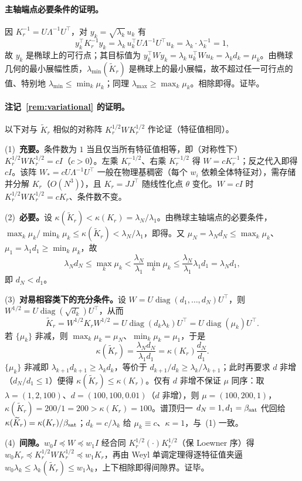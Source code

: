 \documentclass[fontset=windows,11pt]{ctexart}
\newcommand{\W}{W}
\DeclareMathOperator{\diag}{diag}
\numberwithin{equation}{section}
\begin{document}
\paragraph{主轴端点必要条件的证明。}
因 $K_r^{-1}=U\Lambda^{-1}U^\top$，对 $y_k=\sqrt{\lambda_k}\,u_k$ 有
\[
y_k^\top K_r^{-1}y_k=\lambda_k\,u_k^\top U\Lambda^{-1}U^\top u_k=\lambda_k\cdot\lambda_k^{-1}=1,
\]
故 $y_k$ 是椭球上的可行点；其目标值为 $y_k^\top\W y_k=\lambda_k\,u_k^\top\W u_k=\lambda_k d_k=\mu_k$。由椭球几何的最小展幅性质，$\lambda_{\min}(\widetilde K_r)$ 是椭球上的最小展幅，故不超过任一可行点的值、特别地 $\lambda_{\min}\le\min_k\mu_k$；同理 $\lambda_{\max}\ge\max_k\mu_k$。相除即得。证毕。

\paragraph{注记~\ref{rem:variational} 的证明。}
以下对与 $\widetilde K_r$ 相似的对称阵 $K_r^{1/2}\W K_r^{1/2}$ 作论证（特征值相同）。
\par\noindent(1)~\textbf{充要。}条件数为 $1$ 当且仅当所有特征值相等，即（对称性下）$K_r^{1/2}\W K_r^{1/2}=cI$（$c>0$）。左乘 $K_r^{-1/2}$、右乘 $K_r^{-1/2}$ 得 $\W=cK_r^{-1}$；反之代入即得 $cI$。该阵 $\W_*=cU\Lambda^{-1}U^\top$ 一般在物理基稠密（每个 $w_i$ 依赖全体特征对），需存储并分解 $K_r$（$O(N^3)$），且 $K_r=JJ^\top$ 随线性化点 $\theta$ 变化。$\W=cI$ 时 $K_r^{1/2}\W K_r^{1/2}=cK_r$、条件数不变。
\par\noindent(2)~\textbf{必要。}设 $\kappa(\widetilde K_r)<\kappa(K_r)=\lambda_N/\lambda_1$。由椭球主轴端点的必要条件，$\max_k\mu_k/\min_k\mu_k\le\kappa(\widetilde K_r)<\lambda_N/\lambda_1$，即得。又 $\mu_N=\lambda_Nd_N\le\max_k\mu_k$、$\mu_1=\lambda_1d_1\ge\min_k\mu_k$，故
\[
\lambda_Nd_N\le\max_k\mu_k<\frac{\lambda_N}{\lambda_1}\min_k\mu_k\le\frac{\lambda_N}{\lambda_1}\lambda_1d_1=\lambda_Nd_1,
\]
即 $d_N<d_1$。
\par\noindent(3)~\textbf{对易相容类下的充分条件。}设 $\W=U\diag(d_1,\dots,d_N)U^\top$，则 $\W^{1/2}=U\diag(\sqrt{d_k})U^\top$，从而
\[
\widetilde K_r=\W^{1/2}K_r\W^{1/2}=U\diag(d_k\lambda_k)U^\top=U\diag(\mu_k)U^\top.
\]
若 $\{\mu_k\}$ 非减，则 $\max_k\mu_k=\mu_N$、$\min_k\mu_k=\mu_1$，于是
\[
\kappa(\widetilde K_r)=\frac{\lambda_Nd_N}{\lambda_1d_1}=\kappa(K_r)\frac{d_N}{d_1}.
\]
$\{\mu_k\}$ 非减即 $\lambda_{k+1}d_{k+1}\ge\lambda_kd_k$，等价于 $d_{k+1}/d_k\ge\lambda_k/\lambda_{k+1}$；此时再要求 $d$ 非增（$d_N/d_1\le1$）便得 $\kappa(\widetilde K_r)\le\kappa(K_r)$。仅有 $d$ 非增不保证 $\mu$ 同序：取 $\lambda=(1,2,100)$、$d=(100,100,0.01)$（$d$ 非增），则 $\mu=(100,200,1)$，$\kappa(\widetilde K_r)=200/1=200>\kappa(K_r)=100$。谱顶归一 $d_N=1,d_1=\beta_{\rm sat}$ 代回给 $\kappa(\widetilde K_r)=\kappa(K_r)/\beta_{\rm sat}$；$d_k=c/\lambda_k$ 给 $\mu_k\equiv c$、$\kappa=1$，与~(1) 一致。
\par\noindent(4)~\textbf{间隙。}$w_0I\preceq\W\preceq w_1I$ 经合同 $K_r^{1/2}(\cdot)K_r^{1/2}$（保 Loewner 序）得 $w_0K_r\preceq K_r^{1/2}\W K_r^{1/2}\preceq w_1K_r$，再由 Weyl 单调定理得逐特征值夹逼 $w_0\lambda_k\le\lambda_k(\widetilde K_r)\le w_1\lambda_k$，上下相除即得间隙界。证毕。
\end{document}
